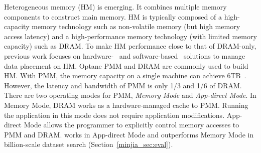 Heterogeneous memory (HM) is emerging. It combines multiple memory components to construct main memory. HM is typically composed of a high-capacity memory technology such as non-volatile memory (but high memory access latency) and a high-performance memory technology (with limited memory capacity) such as DRAM. 
To make HM performance close to that of DRAM-only, previous work focuses on hardware-~\cite{asplos15:agarwal,hetero_mem_arch,qureshi_micro09, ibm_isca09,gpu_pcm_pact13} and software-based~\cite{eurosys16:dulloor,asplos16:lin,wen:ICS18,sc18:wu,unimem:sc17,luo:NGS,cluster20:ren} solutions to manage data placement on HM. Optane PMM and DRAM are commonly used to build HM. With PMM, the memory capacity on a single machine can achieve 6TB~\cite{optane:ucsd}. However, the latency and bandwidth of PMM is only 1/3 and 1/6 of DRAM. There are two operating modes for PMM, \textit{Memory Mode} and \textit{App-direct Mode}. 
In Memory Mode, DRAM works as a hardware-managed cache to PMM. Running the application in this mode does not require application modifications. App-direct Mode allows the programmer to explicitly control memory accesses to PMM and DRAM. \name works in App-direct Mode and outperforms Memory Mode in billion-scale dataset search (Section~\ref{minjia_sec:eval}). 